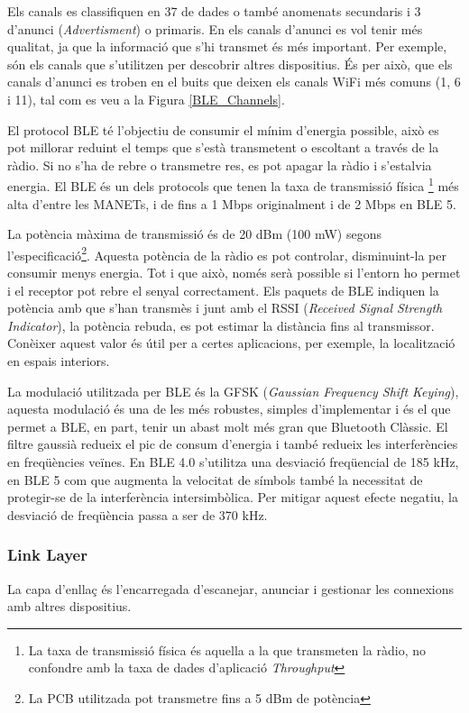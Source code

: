 Els canals es classifiquen en 37 de dades o també anomenats secundaris i 3 d'anunci (\textit{Advertisment}) o primaris.
En els canals d'anunci es vol tenir més qualitat, ja que la informació que s'hi transmet és més important.
Per exemple, són els canals que s'utilitzen per descobrir altres dispositius.
És per això, que els canals d'anunci es troben en el buits que deixen els canals WiFi més comuns (1, 6 i 11), tal com es veu a la Figura \ref{BLE_Channels}.

El protocol BLE té l'objectiu de consumir el mínim d'energia possible, això es pot millorar reduint el temps que s'està transmetent o escoltant a través de la ràdio.
Si no s'ha de rebre o transmetre res, es pot apagar la ràdio i s'estalvia energia.
El BLE és un dels protocols que tenen la taxa de transmissió física \footnote{La taxa de transmissió física és aquella a la que transmeten la ràdio, no confondre amb la taxa de dades d'aplicació \textit{Throughput}} més alta d'entre les MANETs, i de fins a 1 Mbps originalment i de 2 Mbps en BLE 5.

La potència màxima de transmissió és de 20 dBm (100 mW) segons l'especificació\footnote{La PCB utilitzada pot transmetre fins a 5 dBm de potència}.
Aquesta potència de la ràdio es pot controlar, disminuint-la per consumir menys energia.
Tot i que això, només serà possible si l'entorn ho permet i el receptor pot rebre el senyal correctament.
Els paquets de BLE indiquen la potència amb que s'han transmès i junt amb el RSSI (\textit{Received Signal Strength Indicator}), la potència rebuda, es pot estimar la distància fins al transmissor.
Conèixer aquest valor és útil per a certes aplicacions, per exemple, la localització en espais interiors.

La modulació utilitzada per BLE és la GFSK (\textit{Gaussian Frequency Shift Keying}), aquesta modulació és una de les més robustes, simples d'implementar i és el que permet a BLE, en part, tenir un abast molt més gran que Bluetooth Clàssic.
El filtre gaussià redueix el pic de consum d'energia \cite{BLE_Review} i també redueix les interferències en freqüències veïnes.
En BLE 4.0 s'utilitza una desviació freqüencial de 185 kHz, en BLE 5 com que augmenta la velocitat de símbols també la necessitat de protegir-se de la interferència intersimbòlica.
Per mitigar aquest efecte negatiu, la desviació de freqüència passa a ser de 370 kHz.


\subsubsection{Link Layer}
\label{link_layer}
La capa d'enllaç és l'encarregada d'escanejar, anunciar i gestionar les connexions amb altres dispositius.

